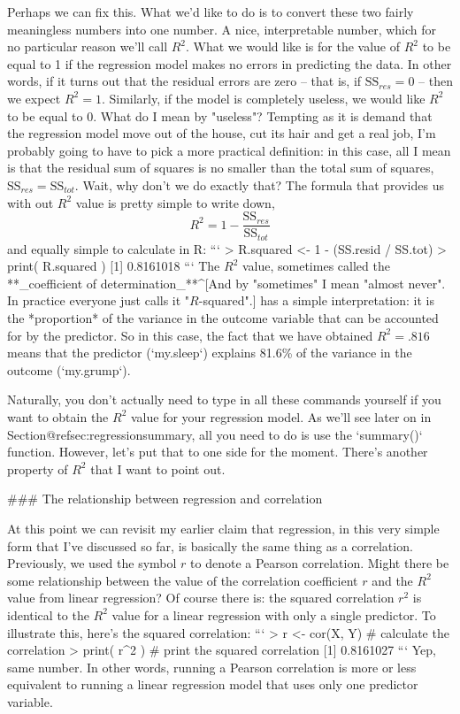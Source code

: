 Perhaps we can fix this. What we'd like to do is to convert these two fairly meaningless numbers into one number. A nice, interpretable number, which for no particular reason we'll call $R^2$. What we would like is for the value of $R^2$ to be equal to 1 if the regression model makes no errors in predicting the data. In other words, if it turns out that the residual errors are zero -- that is, if $\mbox{SS}_{res} = 0$ -- then we expect $R^2 = 1$. Similarly, if the model is completely useless, we would like $R^2$ to be equal to 0. What do I mean by "useless"? Tempting as it is demand that the regression model move out of the house, cut its hair and get a real job, I'm probably going to have to pick a more practical definition: in this case, all I mean is that the residual sum of squares is no smaller than the total sum of squares, $\mbox{SS}_{res} = \mbox{SS}_{tot}$. Wait, why don't we do exactly that? The formula that provides us with out $R^2$ value is pretty simple to write down,
$$
R^2 = 1 - \frac{\mbox{SS}_{res}}{\mbox{SS}_{tot}}
$$
and equally simple to calculate in R:
```
> R.squared <- 1 - (SS.resid / SS.tot)
> print( R.squared )
[1] 0.8161018
```
The $R^2$ value, sometimes called the **_coefficient of determination_**^[And by "sometimes" I mean "almost never". In practice everyone just calls it "$R$-squared".] has a simple interpretation: it is the *proportion* of the variance in the outcome variable that can be accounted for by the predictor. So in this case, the fact that we have obtained $R^2 = .816$ means that the predictor (`my.sleep`) explains 81.6\% of the variance in the outcome (`my.grump`). 

Naturally, you don't actually need to type in all these commands yourself if you want to obtain the $R^2$ value for your regression model. As we'll see later on in Section@refsec:regressionsummary, all you need to do is use the `summary()` function. However, let's put that to one side for the moment. There's another property of $R^2$ that I want to point out. 

### The relationship between regression and correlation

At this point we can revisit my earlier claim that regression, in this very simple form that I've discussed so far, is basically the same thing as a correlation. Previously, we used the symbol $r$ to denote a Pearson correlation. Might there be some relationship between the value of the correlation coefficient $r$ and the $R^2$ value from linear regression? Of course there is: the squared correlation $r^2$ is identical to the $R^2$ value for a linear regression with only a single predictor. To illustrate this, here's the squared correlation:
```
> r <- cor(X, Y)  # calculate the correlation
> print( r^2 )    # print the squared correlation
[1] 0.8161027
```
Yep, same number. In other words, running a Pearson correlation is more or less equivalent to running a linear regression model that uses only one predictor variable.

